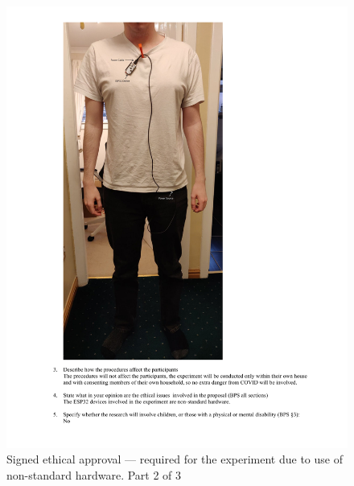 \documentclass{l4proj}
\begin{document}
\begin{appendices}
    \begin{figure}[!htb]
        \centering
        \includegraphics[width=1.0\linewidth]{images/2306841w-ethics-approval 2.pdf}

        \caption{ Signed ethical approval — required for the experiment due to use of non-standard hardware. Part 2 of 3 }

        \label{fig:full_ethics_approval2}
    \end{figure}


\end{appendices}
\end{document}
